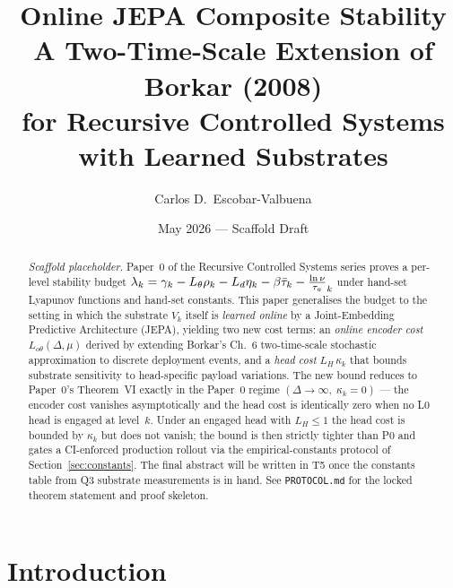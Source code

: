 \documentclass[11pt,a4paper]{article}
\title{Online JEPA Composite Stability\\
A Two-Time-Scale Extension of Borkar (2008)\\
for Recursive Controlled Systems with Learned Substrates}
\author{Carlos D.\ Escobar-Valbuena}
\date{May 2026 --- Scaffold Draft}
\newcommand{\headlip}{L_H}                      %
\newcommand{\onlineenc}{L_{o\theta}}            %
\newcommand{\deplag}{\Delta}                    %
\newcommand{\klcoef}{\mu}                       %
\newcommand{\headvar}{\kappa}                   %
\begin{document}
\maketitle

\begin{abstract}
\emph{Scaffold placeholder.} Paper~0 of the Recursive Controlled Systems
series proves a per-level stability budget
$\lambda_k = \gamma_k - L_\theta \rho_k - L_d \eta_k - \beta \bar{\tau}_k - \frac{\ln \nu}{\tau_a}_k$ under
hand-set Lyapunov functions and hand-set constants. This paper generalises
the budget to the setting in which the substrate $V_k$ itself is
\emph{learned online} by a Joint-Embedding Predictive Architecture (JEPA),
yielding two new cost terms: an \emph{online encoder cost}
$\onlineenc(\deplag, \klcoef)$ derived by extending Borkar's Ch.~6
two-time-scale stochastic approximation to discrete deployment events, and
a \emph{head cost} $\headlip\,\headvar_k$ that bounds substrate
sensitivity to head-specific payload variations. The new bound reduces to
Paper~0's Theorem~VI exactly in the Paper~0 regime
$(\deplag\to\infty,\;\headvar_k = 0)$ --- the encoder cost vanishes
asymptotically and the head cost is identically zero when no L0 head is
engaged at level~$k$. Under an engaged head with $\headlip \le 1$ the
head cost is bounded by $\headvar_k$ but does not vanish; the bound is
then strictly tighter than P0 and gates a CI-enforced production rollout
via the empirical-constants protocol of Section~\ref{sec:constants}. The
final abstract will be written in T5 once the constants table from Q3
substrate measurements is in hand. See \texttt{PROTOCOL.md} for the locked
theorem statement and proof skeleton.
\end{abstract}

\tableofcontents
\newpage

\section{Introduction}
\label{sec:introduction}

\end{document}
